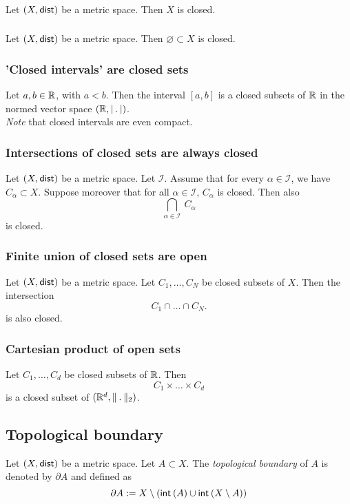 \subsubsection*{}
\uprop Let $(X, \mathsf{dist})$ be a metric space. Then $X$ is closed.

\subsubsection*{}
\uprop Let $(X, \mathsf{dist})$ be a metric space. Then $\varnothing \subset X$ is closed.

\subsubsection*{'Closed intervals' are closed sets}
\uprop Let $a, b \in \mathbb{R}$, with $a < b$. Then the interval $[a,b]$ is a closed
subsets of $\mathbb{R}$ in the normed vector space $(\R, \normR)$.\\
\emph{Note} that closed intervals are even compact.

\subsubsection*{Intersections of closed sets are always closed}
\uthm Let $(X, \mathsf{dist})$ be a metric space. Let $\mathcal{I}$.
Assume that for every $\alpha \in \mathcal{I}$, we have $C_\alpha \subset X$.
Suppose moreover that for all $\alpha \in \mathcal{I}$, $C_\alpha$ is closed.
Then also
\[
    \bigcap_{\alpha \in \mathcal{I}}\ C_\alpha
\]
is closed.

\subsubsection*{Finite union of closed sets are open}
\uprop Let $(X, \mathsf{dist})$ be a metric space. Let $C_1, \dots, C_N$ be closed
subsets of $X$. Then the intersection
\[
    C_1 \cap \dots \cap C_N.
\]
is also closed.

\subsubsection*{Cartesian product of open sets}
\uprop Let $C_1, \dots, C_d$ be closed subsets of $\mathbb{R}$. Then
\[
    C_1 \times \dots \times C_d
\]
is a closed subset of $(\R^d, \norm_2)$.

\subsection*{Topological boundary}
\udef Let $(X, \mathsf{dist})$ be a metric space. Let $A \subset X$.
The \emph{topological boundary} of $A$ is denoted by $\partial A$ and defined as
\[
    \partial A := X \setminus (\setint(A) \cup \setint (X \setminus A))
\]

